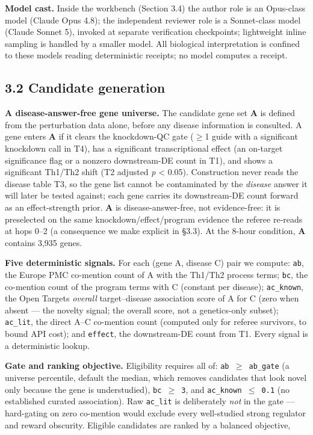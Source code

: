 \noindent \textbf{Model cast.} Inside the workbench (Section 3.4) the author role is an Opus-class model (Claude Opus
4.8); the independent reviewer role is a Sonnet-class model (Claude Sonnet 5), invoked at separate
verification checkpoints; lightweight inline sampling is handled by a smaller model. All
biological interpretation is confined to these models reading deterministic receipts; no model computes a
receipt.

\subsection*{3.2 Candidate generation}\label{candidate-generation}

\noindent \textbf{A disease-answer-free gene universe.} The candidate gene set \textbf{A} is defined from the perturbation
data alone, before any disease information is consulted. A gene enters \textbf{A} if it clears the knockdown-QC
gate ($\geq$1 guide with a significant knockdown call in T4), has a significant transcriptional effect (an
on-target significance flag or a nonzero downstream-DE count in T1), and shows a significant Th1/Th2 shift
(T2 adjusted \emph{p} \textless{} 0.05). Construction never reads the disease table T3, so the gene list cannot be
contaminated by the \emph{disease} answer it will later be tested against; each gene carries its downstream-DE
count forward as an effect-strength prior. \textbf{A} is disease-answer-free, not evidence-free: it is
preselected on the same knockdown/effect/program evidence the referee re-reads at hops 0--2 (a consequence
we make explicit in \S{}3.3). At the 8-hour condition, \textbf{A} contains 3,935 genes.

\noindent \textbf{Five deterministic signals.} For each (gene A, disease C) pair we compute: \texttt{ab}, the Europe PMC
co-mention count of A with the Th1/Th2 process terms; \texttt{bc}, the co-mention count of the program terms with
C (constant per disease); \texttt{ac\_known}, the Open Targets \emph{overall} target--disease association score of A for
C (zero when absent --- the novelty signal; the overall score, not a genetics-only subset); \texttt{ac\_lit}, the
direct A--C co-mention count (computed only for referee
survivors, to bound API cost); and \texttt{effect}, the downstream-DE count from T1. Every signal is a
deterministic lookup.

\noindent \textbf{Gate and ranking objective.} Eligibility requires all of: \texttt{ab\ $\geq$\ ab\_gate} (a universe percentile,
default the median, which removes candidates that look novel only because the gene is understudied),
\texttt{bc\ $\geq$\ 3}, and \texttt{ac\_known\ $\leq$\ 0.1} (no established curated association). Raw \texttt{ac\_lit} is deliberately \emph{not} in the
gate --- hard-gating on zero co-mention would exclude every well-studied strong regulator and reward
obscurity. Eligible candidates are ranked by a balanced objective,

